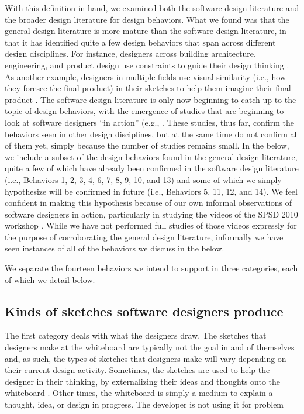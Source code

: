 With this definition in hand, we examined both the software design literature and the broader design literature for design behaviors. What we found was that the general design literature is more mature than the software design literature, in that it has identified quite a few design behaviors that span across different design disciplines. For instance, designers across building architecture, engineering, and product design use constraints to guide their design thinking \cite{cross2007designerly}. As another example, designers in multiple fields use visual similarity (i.e., how they foresee the final product) in their sketches to help them imagine their final product \cite{do1998right}.  
The software design literature is only now beginning to catch up to the topic of design behaviors, with the emergence of studies that are beginning to look at software designers ``in action'' (e.g., \cite{baker2012guest,cherubini2007let,dekel2007notation,petre2009insights}. These studies, thus far, confirm the behaviors seen in other design disciplines, but at the same time do not confirm all of them yet, simply because the number of studies remains small. In the below, we include a subset of the design behaviors found in the general design literature, quite a few of which have already been confirmed in the software design literature (i.e., Behaviors 1, 2, 3, 4, 6, 7, 8, 9, 10, and 13) and some of which we simply hypothesize will be confirmed in future (i.e., Behaviors 5, 11, 12, and 14).  We feel confident in making this hypothesis because of our own informal observations of software designers in action, particularly in studying the videos of the SPSD 2010 workshop \cite{baker2012guest}. While we have not performed full studies of those videos expressly for the purpose of corroborating the general design literature, informally we have seen instances of all of the behaviors we discuss in the below. 

We separate the fourteen behaviors we intend to support in three categories, each of which we detail below.

\subsection{Kinds of sketches software designers produce}

The first category deals with what the designers draw. The sketches that designers make at the whiteboard are typically not the goal in and of themselves and, as such, the types of sketches that designers make will vary depending on their current design activity. Sometimes, the sketches are used to help the designer in their thinking, by externalizing their ideas and thoughts onto the whiteboard \cite{lawson1994design}. Other times, the whiteboard is simply a medium to explain a thought, idea, or design in progress. The developer is not using it for problem solving, but instead to communicate information to a listener or collaborator \cite{eugene1992engineering}. Because of these different purposes, what designers draw is dependent on what they work on at what point during a design meeting. This leads to the following design behaviors.

